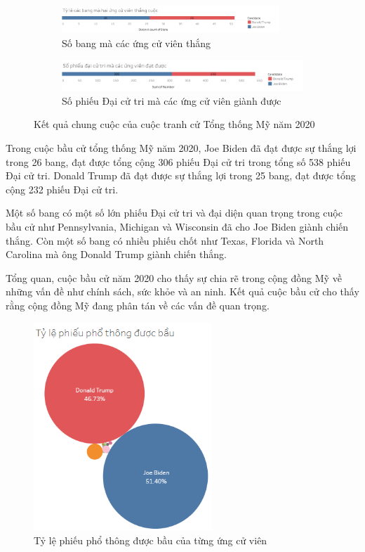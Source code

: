 \documentclass[14pt, a4paper]{article}
\numberwithin{equation}{section}
\numberwithin{figure}{section}
\numberwithin{dl}{section}
\numberwithin{md}{section}
\numberwithin{bd}{section}
\numberwithin{dn}{section}
\numberwithin{hq}{section}
\begin{document}
    \begin{figure}[h!]
        \centering
        \begin{subfigure}[b]{\textwidth}
            \includegraphics[width=0.9\textwidth]{figures/State_Candidate_Win.png}
            \caption{Số bang mà các ứng cử viên thắng}
        \end{subfigure}
        \vfill
        \begin{subfigure}[b]{\linewidth}
            \includegraphics[width=0.9\linewidth]{figures/Electoral_Vote_Candidate_Win.png}
            \caption{Số phiếu Đại cử tri mà các ứng cử viên giành được}
        \end{subfigure}
        \caption{Kết quả chung cuộc của cuộc tranh cử Tổng thống Mỹ năm 2020}
    \end{figure}

    Trong cuộc bầu cử tổng thống Mỹ năm 2020, Joe Biden đã đạt được sự thắng lợi trong 26 bang, đạt được tổng cộng 306 phiếu Đại cử tri trong tổng số 538 phiếu Đại cử tri. 
    Donald Trump đã đạt được sự thắng lợi trong 25 bang, đạt được tổng cộng 232 phiếu Đại cử tri.

    Một số bang có một số lớn phiếu Đại cử tri và đại diện quan trọng trong cuộc bầu cử như Pennsylvania, Michigan và Wisconsin đã cho Joe Biden giành chiến thắng. 
    Còn một số bang có nhiều phiếu chốt như Texas, Florida và North Carolina mà ông Donald Trump giành chiến thắng.

    Tổng quan, cuộc bầu cử năm 2020 cho thấy sự chia rẽ trong cộng đồng Mỹ về những vấn đề như chính sách, sức khỏe và an ninh. 
    Kết quả cuộc bầu cử cho thấy rằng cộng đồng Mỹ đang phân tán về các vấn đề quan trọng.

    \begin{figure}[h!]
        \centering
        \includegraphics[width=0.6\textwidth]{Percentage_Total_Candidates_Bubble_Chart.png}
        \caption{Tỷ lệ phiếu phổ thông được bầu của từng ứng cử viên}
    \end{figure}
\end{document}

